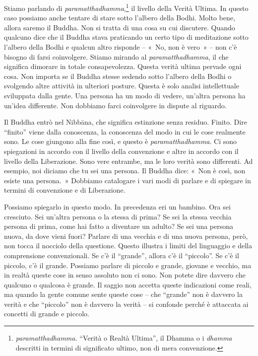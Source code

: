 Stiamo parlando di \emph{paramatthadhamma},\footnote{\emph{paramatthadhamma.}
  ``Verità o Realtà Ultima'', il Dhamma o i \emph{dhamma} descritti in
  termini di significato ultimo, non di mera convenzione.} il livello
della Verità Ultima. In questo caso possiamo anche tentare di stare
sotto l'albero della Bodhi. Molto bene, allora saremo il Buddha. Non si
tratta di una cosa su cui discutere. Quando qualcuno dice che il Buddha
stava praticando un certo tipo di meditazione sotto l'albero della Bodhi
e qualcun altro risponde -- «~No, non è vero~» -- non c'è bisogno di
farsi coinvolgere. Stiamo mirando al \emph{paramatthadhamma}, il che
significa dimorare in totale consapevolezza. Questa verità ultima
pervade ogni cosa. Non importa se il Buddha stesse sedendo sotto
l'albero della Bodhi o svolgendo altre attività in ulteriori posture.
Questa è solo analisi intellettuale sviluppata dalla gente. Una persona
ha un modo di vedere, un'altra persona ha un'idea differente. Non
dobbiamo farci coinvolgere in dispute al riguardo.

Il Buddha entrò nel Nibbāna, che significa estinzione senza
residuo. Finito. Dire ``finito'' viene dalla conoscenza, la conoscenza
del modo in cui le cose realmente sono. Le cose giungono alla fine così,
e questo è \emph{paramatthadhamma}. Ci sono spiegazioni in accordo con
il livello della convenzione e altre in accordo con il livello della
Liberazione. Sono vere entrambe, ma le loro verità sono differenti. Ad
esempio, noi diciamo che tu sei una persona. Il Buddha dice: «~Non è
così, non esiste una persona.~» Dobbiamo catalogare i vari modi di
parlare e di spiegare in termini di convenzione e di Liberazione.

Possiamo spiegarlo in questo modo. In precedenza eri un bambino. Ora sei
cresciuto. Sei un'altra persona o la stessa di prima? Se sei la stessa
vecchia persona di prima, come hai fatto a diventare un adulto? Se sei
una persona nuova, da dove vieni fuori? Parlare di una vecchia e di una
nuova persona, però, non tocca il nocciolo della questione. Questo
illustra i limiti del linguaggio e della comprensione convenzionali. Se
c'è il ``grande'', allora c'è il ``piccolo''. Se c'è il piccolo, c'è il
grande. Possiamo parlare di piccolo e grande, giovane e vecchio, ma in
realtà queste cose in senso assoluto non ci sono. Non potete dire
davvero che qualcuno o qualcosa è grande. Il saggio non accetta queste
indicazioni come reali, ma quando la gente comune sente queste cose --
che ``grande'' non è davvero la verità e che ``piccolo'' non è davvero
la verità -- si confonde perché è attaccata ai concetti di grande e
piccolo.

